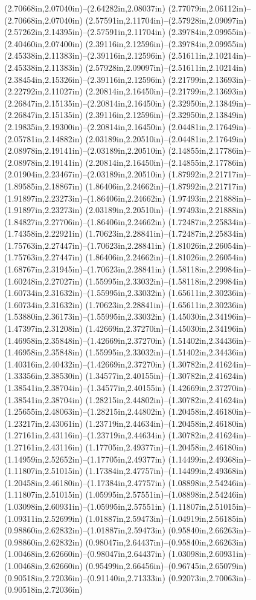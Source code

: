 (2.70668in,2.07040in)--(2.64282in,2.08037in) (2.77079in,2.06112in)--(2.70668in,2.07040in) (2.57591in,2.11704in)--(2.57928in,2.09097in) (2.57262in,2.14395in)--(2.57591in,2.11704in) (2.39784in,2.09955in)--(2.40460in,2.07400in) (2.39116in,2.12596in)--(2.39784in,2.09955in) (2.45338in,2.11383in)--(2.39116in,2.12596in) (2.51611in,2.10214in)--(2.45338in,2.11383in) (2.57928in,2.09097in)--(2.51611in,2.10214in) (2.38454in,2.15326in)--(2.39116in,2.12596in) (2.21799in,2.13693in)--(2.22792in,2.11027in) (2.20814in,2.16450in)--(2.21799in,2.13693in) (2.26847in,2.15135in)--(2.20814in,2.16450in) (2.32950in,2.13849in)--(2.26847in,2.15135in) (2.39116in,2.12596in)--(2.32950in,2.13849in) (2.19835in,2.19300in)--(2.20814in,2.16450in) (2.04481in,2.17649in)--(2.05781in,2.14882in) (2.03189in,2.20510in)--(2.04481in,2.17649in) (2.08978in,2.19141in)--(2.03189in,2.20510in) (2.14855in,2.17786in)--(2.08978in,2.19141in) (2.20814in,2.16450in)--(2.14855in,2.17786in) (2.01904in,2.23467in)--(2.03189in,2.20510in) (1.87992in,2.21717in)--(1.89585in,2.18867in) (1.86406in,2.24662in)--(1.87992in,2.21717in) (1.91897in,2.23273in)--(1.86406in,2.24662in) (1.97493in,2.21888in)--(1.91897in,2.23273in) (2.03189in,2.20510in)--(1.97493in,2.21888in) (1.84827in,2.27706in)--(1.86406in,2.24662in) (1.72487in,2.25834in)--(1.74358in,2.22921in) (1.70623in,2.28841in)--(1.72487in,2.25834in) (1.75763in,2.27447in)--(1.70623in,2.28841in) (1.81026in,2.26054in)--(1.75763in,2.27447in) (1.86406in,2.24662in)--(1.81026in,2.26054in) (1.68767in,2.31945in)--(1.70623in,2.28841in) (1.58118in,2.29984in)--(1.60248in,2.27027in) (1.55995in,2.33032in)--(1.58118in,2.29984in) (1.60734in,2.31632in)--(1.55995in,2.33032in) (1.65611in,2.30236in)--(1.60734in,2.31632in) (1.70623in,2.28841in)--(1.65611in,2.30236in) (1.53880in,2.36173in)--(1.55995in,2.33032in) (1.45030in,2.34196in)--(1.47397in,2.31208in) (1.42669in,2.37270in)--(1.45030in,2.34196in) (1.46958in,2.35848in)--(1.42669in,2.37270in) (1.51402in,2.34436in)--(1.46958in,2.35848in) (1.55995in,2.33032in)--(1.51402in,2.34436in) (1.40316in,2.40432in)--(1.42669in,2.37270in) (1.30782in,2.41624in)--(1.33356in,2.38530in) (1.34577in,2.40155in)--(1.30782in,2.41624in) (1.38541in,2.38704in)--(1.34577in,2.40155in) (1.42669in,2.37270in)--(1.38541in,2.38704in) (1.28215in,2.44802in)--(1.30782in,2.41624in) (1.25655in,2.48063in)--(1.28215in,2.44802in) (1.20458in,2.46180in)--(1.23217in,2.43061in) (1.23719in,2.44634in)--(1.20458in,2.46180in) (1.27161in,2.43116in)--(1.23719in,2.44634in) (1.30782in,2.41624in)--(1.27161in,2.43116in) (1.17705in,2.49377in)--(1.20458in,2.46180in) (1.14959in,2.52652in)--(1.17705in,2.49377in) (1.14499in,2.49368in)--(1.11807in,2.51015in) (1.17384in,2.47757in)--(1.14499in,2.49368in) (1.20458in,2.46180in)--(1.17384in,2.47757in) (1.08898in,2.54246in)--(1.11807in,2.51015in) (1.05995in,2.57551in)--(1.08898in,2.54246in) (1.03098in,2.60931in)--(1.05995in,2.57551in) (1.11807in,2.51015in)--(1.09311in,2.52699in) (1.01887in,2.59473in)--(1.04919in,2.56185in) (0.98860in,2.62832in)--(1.01887in,2.59473in) (0.95840in,2.66263in)--(0.98860in,2.62832in) (0.98047in,2.64437in)--(0.95840in,2.66263in) (1.00468in,2.62660in)--(0.98047in,2.64437in) (1.03098in,2.60931in)--(1.00468in,2.62660in) (0.95499in,2.66456in)--(0.96745in,2.65079in) (0.90518in,2.72036in)--(0.91140in,2.71333in) (0.92073in,2.70063in)--(0.90518in,2.72036in) 